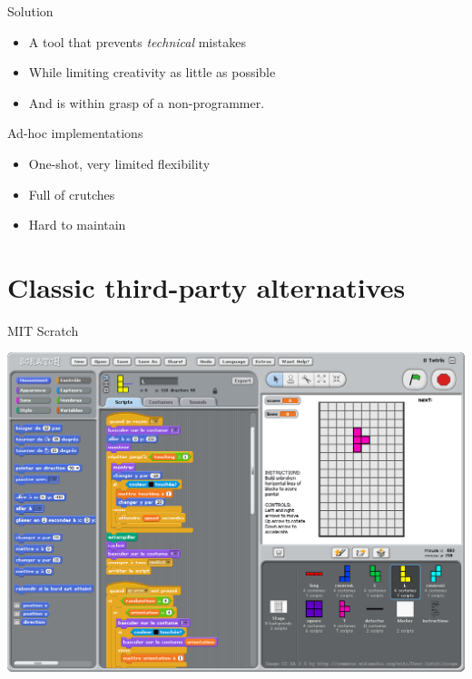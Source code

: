 \documentclass[handout]{beamer}
\begin{document}

\begin{frame}{Solution}

\begin{itemize}
\item A tool that prevents \textit{technical} mistakes
\item While limiting creativity as little as possible
\item And is within grasp of a non-programmer.
\end{itemize}

\end{frame}


\begin{frame}{Ad-hoc implementations}

\begin{itemize}
\item One-shot, very limited flexibility
\item Full of crutches
\item Hard to maintain
\end{itemize}

\end{frame}


\section{Classic third-party alternatives}


\begin{frame}{MIT Scratch}

\includegraphics[height=.8\textheight]{scratch}

\end{frame}
\end{document}
